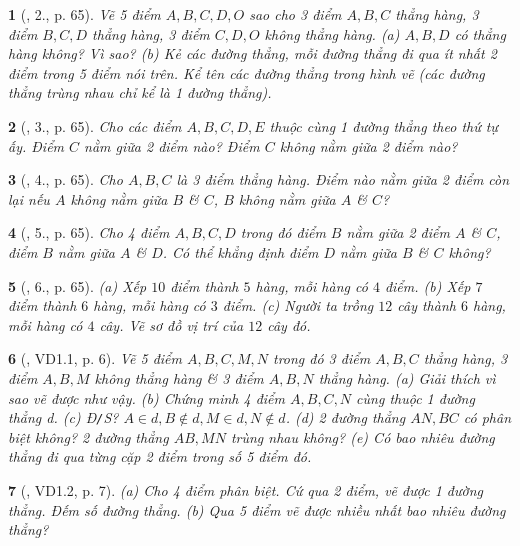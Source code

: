 \documentclass{article}
\newtheorem{baitoan}{}
\begin{document}
\begin{baitoan}[\cite{Binh_Toan_6_tap_2}, 2., p. 65]
	Vẽ 5 điểm $A,B,C,D,O$ sao cho 3 điểm $A,B,C$ thẳng hàng, 3 điểm $B,C,D$ thẳng hàng, 3 điểm $C,D,O$ không thẳng hàng. (a) $A,B,D$ có thẳng hàng không? Vì sao? (b) Kẻ các đường thẳng, mỗi đường thẳng đi qua ít nhất 2 điểm trong 5 điểm nói trên. Kể tên các đường thẳng trong hình vẽ (các đường thẳng trùng nhau chỉ kể là 1 đường thẳng).
\end{baitoan}

\begin{baitoan}[\cite{Binh_Toan_6_tap_2}, 3., p. 65]
	Cho các điểm $A,B,C,D,E$ thuộc cùng 1 đường thẳng theo thứ tự ấy. Điểm $C$ nằm giữa 2 điểm nào? Điểm $C$ không nằm giữa 2 điểm nào?
\end{baitoan}

\begin{baitoan}[\cite{Binh_Toan_6_tap_2}, 4., p. 65]
	Cho $A,B,C$ là 3 điểm thẳng hàng. Điểm nào nằm giữa 2 điểm còn lại nếu $A$ không nằm giữa $B$ \& $C$, $B$ không nằm giữa $A$ \& $C$?
\end{baitoan}

\begin{baitoan}[\cite{Binh_Toan_6_tap_2}, 5., p. 65]
	Cho 4 điểm $A,B,C,D$ trong đó điểm $B$ nằm giữa 2 điểm $A$ \& $C$, điểm $B$ nằm giữa $A$ \& $D$. Có thể khẳng định điểm $D$ nằm giữa $B$ \& $C$ không?
\end{baitoan}

\begin{baitoan}[\cite{Binh_Toan_6_tap_2}, 6., p. 65]
	(a) Xếp $10$ điểm thành $5$ hàng, mỗi hàng có $4$ điểm. (b) Xếp $7$ điểm thành $6$ hàng, mỗi hàng có $3$ điểm. (c) Người ta trồng $12$ cây thành $6$ hàng, mỗi hàng có $4$ cây. Vẽ sơ đồ vị trí của $12$ cây đó.
\end{baitoan}

\begin{baitoan}[\cite{TLCT_THCS_Toan_6_hinh_hoc}, VD1.1, p. 6]
	Vẽ 5 điểm $A,B,C,M,N$ trong đó 3 điểm $A,B,C$ thẳng hàng, 3 điểm $A,B,M$ không thẳng hàng \& 3 điểm $A,B,N$ thẳng hàng. (a) Giải thích vì sao vẽ được như vậy. (b) Chứng minh 4 điểm $A,B,C,N$ cùng thuộc 1 đường thẳng d. (c) {\rm Đ{\tt/}S?} $A\in d,B\notin d,M\in d,N\notin d$. (d) 2 đường thẳng $AN,BC$ có phân biệt không? 2 đường thẳng $AB,MN$ trùng nhau không? (e) Có bao nhiêu đường thẳng đi qua từng cặp 2 điểm trong số 5 điểm đó.
\end{baitoan}

\begin{baitoan}[\cite{TLCT_THCS_Toan_6_hinh_hoc}, VD1.2, p. 7]
	(a) Cho 4 điểm phân biệt. Cứ qua 2 điểm, vẽ được 1 đường thẳng. Đếm số đường thẳng. (b) Qua 5 điểm vẽ được nhiều nhất bao nhiêu đường thẳng?
\end{baitoan}
\end{document}
